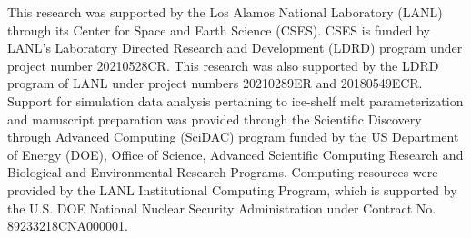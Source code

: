 \documentclass[tc, manuscript]{copernicus}
\begin{document}


\begin{acknowledgements}
This research was supported by the Los Alamos National Laboratory (LANL) through its Center for Space and Earth Science (CSES). CSES is funded by LANL’s Laboratory Directed Research and Development (LDRD) program under project number 20210528CR. This research was also supported by the LDRD program of LANL under project numbers 20210289ER and 20180549ECR. Support for simulation data analysis pertaining to ice-shelf melt parameterization and manuscript preparation was provided through the Scientific Discovery through Advanced Computing (SciDAC) program funded by the US Department of Energy (DOE), Office of Science, Advanced Scientific Computing Research and Biological and Environmental Research Programs. Computing resources were provided by the LANL Institutional Computing Program, which is supported by the U.S. DOE National Nuclear Security Administration under Contract No. 89233218CNA000001. 
\end{acknowledgements}



\end{document}
